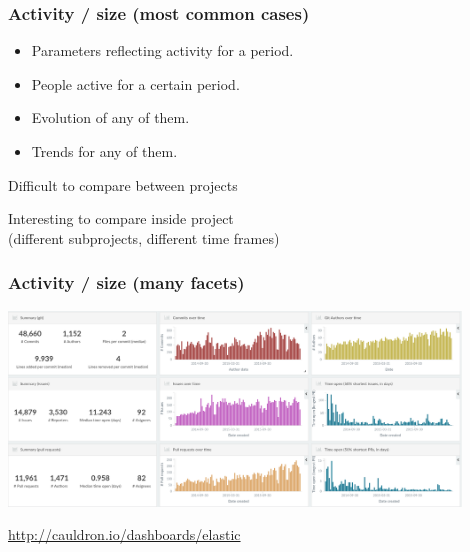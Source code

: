 \documentclass[17pt,aspectratio=169,hyperref=pdfusetitle]{beamer}
\begin{document}

\begin{frame}
\frametitle{Activity / size (most common cases)}

  \begin{itemize}
  \item Parameters reflecting activity for a period.
  \item People active for a certain period.
  \item Evolution of any of them.
  \item Trends for any of them.
  \end{itemize}
\vspace{.5cm}

\begin{flushright}
  Difficult to compare between projects

  \vspace{.5cm}
  
  Interesting to compare inside project \\
  (different subprojects, different time frames) \\
\end{flushright}
\end{frame}


\begin{frame}
\frametitle{Activity / size (many facets)}

\begin{center}
  \includegraphics[width=12cm]{figs/activity-elastic}

  \url{http://cauldron.io/dashboards/elastic}
  
\end{center}

\end{frame}

\end{document}
